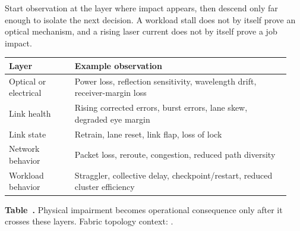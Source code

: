 Start observation at the layer where impact appears, then descend only far
enough to isolate the next decision. A workload stall does not by itself prove
an optical mechanism, and a rising laser current does not by itself prove a
job impact.

\begin{table}[ht]
\label{tab:ops-layer-translation}%
\centering
\setlength{\tabcolsep}{3pt}%
\footnotesize
\renewcommand{\arraystretch}{1.2}%
\begin{tabular}{@{}p{0.22\linewidth}p{0.72\linewidth}@{}}
\toprule
Layer & Example observation \\
\midrule
Optical or electrical &
Power loss, reflection sensitivity, wavelength drift, receiver-margin loss \\
\addlinespace[0.45em]
Link health &
Rising corrected errors, burst errors, lane skew, degraded eye margin \\
\addlinespace[0.45em]
Link state &
Retrain, lane reset, link flap, loss of lock \\
\addlinespace[0.45em]
Network behavior &
Packet loss, reroute, congestion, reduced path diversity \\
\addlinespace[0.45em]
Workload behavior &
Straggler, collective delay, checkpoint/restart, reduced cluster efficiency \\
\bottomrule
\end{tabular}
\par\medskip
{\raggedright\footnotesize\textbf{Table~\thetable.} Physical impairment becomes
operational consequence only after it crosses these layers. Fabric topology
context: .\par}
\end{table}
\FloatBarrier

